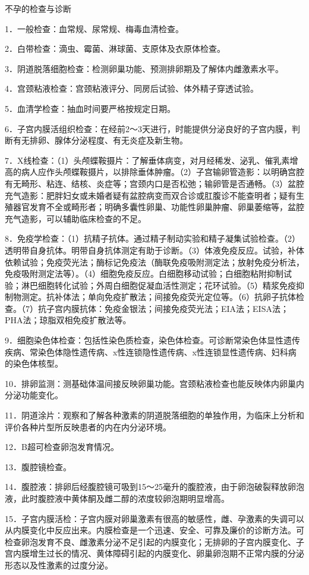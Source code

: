 \documentclass[12pt,UTF8,openany]{ctexbook}
\begin{document}
不孕的检查与诊断


1．一般检查：血常规、尿常规、梅毒血清检查。

2．白带检查：滴虫、霉菌、淋球菌、支原体及衣原体检查。

3．阴道脱落细胞检查：检测卵巢功能、预测排卵期及了解体内雌激素水平。

4．宫颈粘液检查：宫颈粘液评分、同房后试验、体外精子穿透试验。

5．血清学检查：抽血时间要严格按规定日期。

6．子宫内膜活组织检查：在经前2～3天进行，时能提供分泌良好的子宫内膜，判断有无排卵、腺体分泌程度、有无炎症及新生物。

7．X线检查：（1）头颅蝶鞍摄片：了解垂体病变，对月经稀发、泌乳、催乳素增高的病人应作头颅蝶鞍摄片，以排除垂体肿瘤。（2）子宫输卵管造影：以明确宫腔有无畸形、粘连、结核、炎症等；宫颈内口是否松弛；输卵管是否通畅。（3）盆腔充气造影：肥胖妇女或未婚者疑有盆腔病变而双合诊或肛腹诊不能查明者；疑有生殖器官发育不全或畸形者；明确多囊性卵巢、功能性卵巢肿瘤、卵巢萎缩等，盆腔充气造影，可以辅助临床检查的不足。

8．免疫学检查：（1）抗精子抗体。通过精子制动实验和精子凝集试验检查。（2）透明带自身抗体。明带自身抗体测定有助于诊断。（3）体液免疫反应。试验，补体依赖试验；免疫荧光法；酶标记免疫法（酶联免疫吸附测定法；放射免疫分析法，免疫吸附测定法等）。（4）细胞免疫反应。白细胞移动试验；白细胞粘附抑制试验；淋巴细胞转化试验；外周白细胞促凝血活性测定；花环试验。（5）精浆免疫抑制物测定。抗补体法；单向免疫扩散法；间接免疫荧光定位等。（6）抗卵子抗体检查。（7）抗子宫内膜抗体：免疫金银法；间接免疫荧光法；EIA法；EISA法；PHA法；琼脂双相免疫扩散法等。

9．细胞染色体检查：包括性染色质检查，染色体检查。可诊断常染色体显性遗传疾病、常染色体隐性遗传病、x性连锁隐性遗传病、x性连锁显性遗传病、妇科病的染色体核型。

10．排卵监测：测基础体温间接反映卵巢功能。宫颈粘液检查也能反映体内卵巢内分泌功能变化。

11．阴道涂片：观察和了解各种激素的阴道脱落细胞的单独作用，为临床上分析和评价各种片型所反映患者的内在内分泌环境。

12．B超可检查卵泡发育情况。

13．腹腔镜检查。

14．腹腔液：排卵后经腹腔镜可吸到15～25毫升的腹腔液，由于卵泡破裂释放卵泡液，此时腹腔液中黄体酮及雌二醇的浓度较卵泡期明显增高。

15．子宫内膜活检：子宫内膜对卵巢激素有很高的敏感性，雌、孕激素的失调可以从内膜变化中反应出来。内膜检查是一个迅速、安全、可靠及廉价的诊断方法。可检查卵泡发育不良、雌激素分泌不足引起的内膜变化；无排卵的子宫内膜变化、子宫内膜增生过长的情况、黄体障碍引起的内膜变化、卵巢卵泡期不正常内膜的分泌形态以及性激素的过度分泌。
\end{document}
